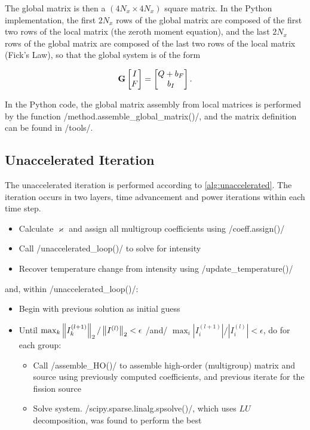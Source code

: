 \documentclass{template}
\begin{document}
The global matrix is then a $(4N_x \times 4N_x)$ square matrix. In the Python implementation, the first $2N_x$ rows of the global matrix are composed of the first two rows of the local matrix (the zeroth moment equation), and the last $2N_x$ rows of the global matrix are composed of the last two rows of the local matrix (Fick's Law), so that the global system is of the form

\begin{equation}
    \mathbf{{G}} \begin{bmatrix}
        I\\
        F
    \end{bmatrix} = \begin{bmatrix}
        Q + b_F\\
        b_I
    \end{bmatrix}.
\end{equation}

In the Python code, the global matrix assembly from local matrices is performed by the function {\pythoninline/method.assemble_global_matrix()/}, and the matrix definition can be found in {\pythoninline/tools/}.

\subsection{Unaccelerated Iteration}

The unaccelerated iteration is performed according to \autoref{alg:unaccelerated}. The iteration occurs in two layers, time advancement and power iterations within each time step.

\begin{itemize}
    \item Calculate $\varkappa$ and assign all multigroup coefficients using {\pythoninline/coeff.assign()/}
    \item Call {\pythoninline/unaccelerated_loop()/} to solve for intensity
    \item Recover temperature change from intensity using {\pythoninline/update_temperature()/}
\end{itemize}

and, within {\pythoninline/unaccelerated_loop()/}:

\begin{itemize}
    \item Begin with previous solution as initial guess
    \item Until $\max_k \left\| {I_k^{(l+1)}} \right\|_2/\left\| {I^{(l)}} \right\|_2 < \epsilon$ {\pythoninline/and/} $\max_i |I_{i}^{(l+1)}|/|I_{i}^{(l)}| < \epsilon$, do for each group:
    \begin{itemize}
        \item Call {\pythoninline/assemble_HO()/} to assemble high-order (multigroup) matrix and source using previously computed coefficients, and previous iterate for the fission source
        \item Solve system. {\pythoninline/scipy.sparse.linalg.spsolve()/}, which uses $LU$ decomposition, was found to perform the best
    \end{itemize}
\end{itemize}
\end{document}
